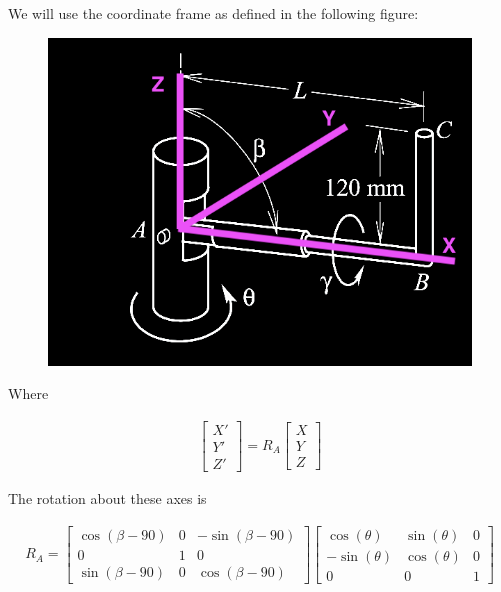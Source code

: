 \documentclass[12pt, letterpaper]{../assignment}
\begin{document}
We will use the coordinate frame as defined in the following figure:

\begin{figure}[H]
    \centering
    \includegraphics[frame]{images/P_3_18_cf.png}
\end{figure}

Where

\begin{equation*}
    \begin{aligned}
        \left[\begin{array}{c} X' \\ Y' \\ Z' \end{array}\right] =
        R_A \left[\begin{array}{c} X \\ Y \\ Z \end{array}\right]   
    \end{aligned}
\end{equation*}

The rotation about these axes is

\begin{equation*}
    \begin{aligned}
        R_A =  \left[\begin{array}{ccc} \cos\left(\beta-90\right) & 0 & -\sin\left(\beta-90\right)\\ 0 & 1 & 0\\ \sin\left(\beta-90\right) & 0 & \cos\left(\beta-90\right) \end{array}\right]
        \left[\begin{array}{ccc} \cos\left(\theta\right) & \sin\left(\theta\right) & 0\\ -\sin\left(\theta\right) & \cos\left(\theta\right) & 0\\ 0 & 0 & 1 \end{array}\right]
    \end{aligned}
\end{equation*}
\end{document}
